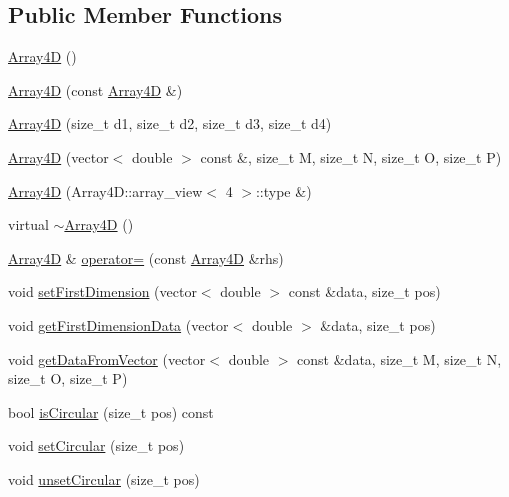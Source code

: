 \subsection*{Public Member Functions}
\begin{DoxyCompactItemize}
\item 
\mbox{\hyperlink{class_array4_d_a1bc84c0dcc22ed0e218040b01f56b816}{Array4D}} ()
\item 
\mbox{\hyperlink{class_array4_d_a7395b077e949df98c4cfe0c0aa93f2a8}{Array4D}} (const \mbox{\hyperlink{class_array4_d}{Array4D}} \&)
\item 
\mbox{\hyperlink{class_array4_d_a2b0e0536b5e40fec5694fdcaebdcff6a}{Array4D}} (size\+\_\+t d1, size\+\_\+t d2, size\+\_\+t d3, size\+\_\+t d4)
\item 
\mbox{\hyperlink{class_array4_d_a3bdc27c55418d992f2278f54fa8186e5}{Array4D}} (vector$<$ double $>$ const \&, size\+\_\+t M, size\+\_\+t N, size\+\_\+t O, size\+\_\+t P)
\item 
\mbox{\hyperlink{class_array4_d_a5c5b3aa5f576edefc2e9a61afa87e451}{Array4D}} (Array4\+D\+::array\+\_\+view$<$ 4 $>$\+::type \&)
\item 
virtual \mbox{\hyperlink{class_array4_d_ae82ddfe43f803f16e7904dc839b63eab}{$\sim$\+Array4D}} ()
\item 
\mbox{\hyperlink{class_array4_d}{Array4D}} \& \mbox{\hyperlink{class_array4_d_aa56a432098cf289a2cc340dfc5635634}{operator=}} (const \mbox{\hyperlink{class_array4_d}{Array4D}} \&rhs)
\item 
void \mbox{\hyperlink{class_array4_d_a05273ec7b80fb8eb738dfcf74a54ab5f}{set\+First\+Dimension}} (vector$<$ double $>$ const \&data, size\+\_\+t pos)
\item 
void \mbox{\hyperlink{class_array4_d_a3f8123825b362550f792aa6d0a114304}{get\+First\+Dimension\+Data}} (vector$<$ double $>$ \&data, size\+\_\+t pos)
\item 
void \mbox{\hyperlink{class_array4_d_ae059c2a19884a0d4e45995e997b55dfe}{get\+Data\+From\+Vector}} (vector$<$ double $>$ const \&data, size\+\_\+t M, size\+\_\+t N, size\+\_\+t O, size\+\_\+t P)
\item 
bool \mbox{\hyperlink{class_array4_d_abbcf6caa1305cd5709e6f194e961614d}{is\+Circular}} (size\+\_\+t pos) const
\item 
void \mbox{\hyperlink{class_array4_d_ab4574e45a22610a3e9768542afe76797}{set\+Circular}} (size\+\_\+t pos)
\item 
void \mbox{\hyperlink{class_array4_d_ac6d1282e0d765748c192a72d60274853}{unset\+Circular}} (size\+\_\+t pos)

\end{DoxyCompactItemize}
